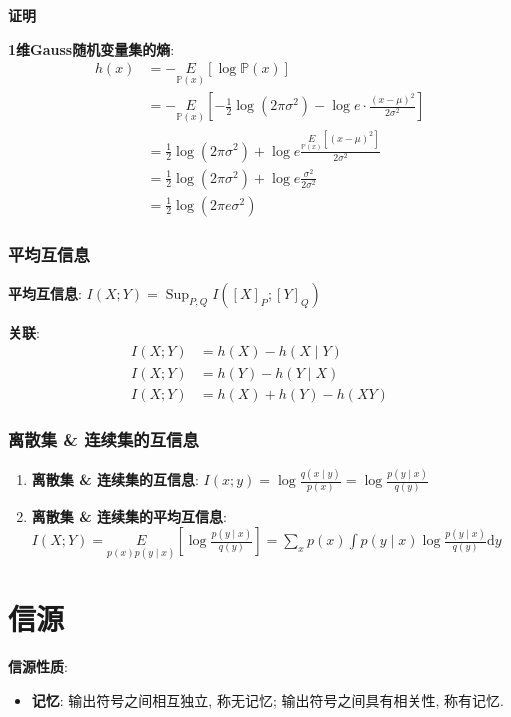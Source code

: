 \documentclass{article}
\newcommand{\env}[2]{\begin{#1}#2\end{#1}}
\newcommand{\proof}[1]{\textbf{证明} #1}
\begin{document}
            \proof{\par
                \textbf{1维Gauss随机变量集的熵}: 
                \env{align*}{
                    h(x) 
                    &= -\underset{\mathbb P(x)}{E}[\log \mathbb P(x)]\\
                    &= -\underset{\mathbb P(x)}{E}\left[-\frac{1}{2}\log(2\pi\sigma^2) - \log e · \frac{(x-\mu)^2}{2\sigma ^2}  \right]\\
                    &= \frac{1}{2}\log(2\pi\sigma^2) + \log e \frac{\underset{\mathbb P(x)}{E}\left[(x-\mu)^2\right]}{2\sigma ^2}\\
                    &= \frac{1}{2}\log(2\pi\sigma^2) + \log e \frac{\sigma ^2}{2\sigma ^2}\\
                    &= \frac{1}{2}\log(2\pi e\sigma^2)
                }
            }
            
        \subsubsection{平均互信息}
            \textbf{平均互信息}: $I(X ; Y)=\operatorname{Sup}_{P, Q} I\left([X]_{P} ;[Y]_{Q}\right)$
            
            \textbf{关联}:
                \env{align*}{
                    I(X ; Y) &= h(X)-h(X \mid Y) \\
                    I(X ; Y) &= h(Y)-h(Y \mid X) \\
                    I(X ; Y) &= h(X)+h(Y)-h(X Y)
                }
                
        \subsubsection{离散集 \& 连续集的互信息}
            \env{enumerate}{
                \item \textbf{离散集 \& 连续集的互信息}: $I(x ; y)=\log \frac{q(x \mid y)}{p(x)}=\log \frac{p(y \mid x)}{q(y)}$
                \item \textbf{离散集 \& 连续集的平均互信息}: $I(X ; Y)=\underset{p(x) p(y \mid x)}{E}\left[\log \frac{p(y \mid x)}{q(y)}\right]=\sum_{x} p(x) \int p(y \mid x) \log \frac{p(y \mid x)}{q(y)} \mathrm{d} y$
            }
            
            
\section{信源}

    \textbf{信源性质}:
        \env{itemize}{
            \item \textbf{记忆}: 输出符号之间相互独立, 称无记忆; 输出符号之间具有相关性, 称有记忆.
        }
    
\end{document}
